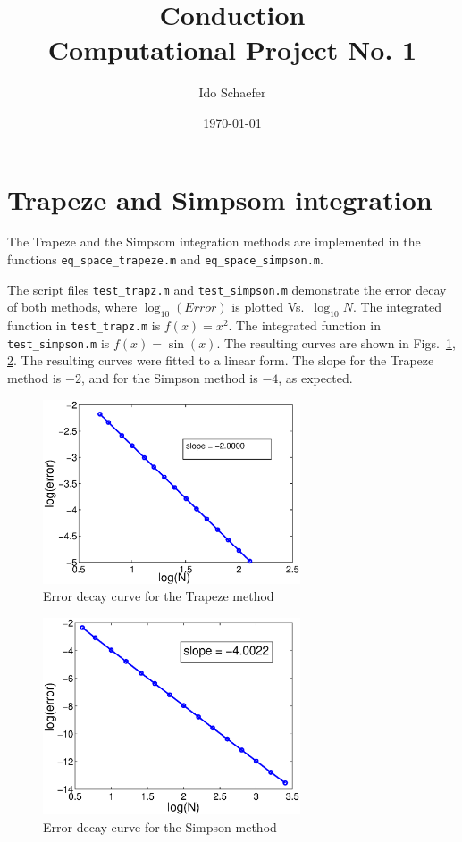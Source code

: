 \documentclass[12pt, a4paper]{article}
\begin{document}
\title{Conduction\\
Computational Project No. 1}
\author{Ido Schaefer}
\date{\today}
\maketitle

\section{Trapeze and Simpsom integration}
The Trapeze and the Simpsom integration methods are implemented in the functions \texttt{eq\_space\_trapeze.m} and \texttt{eq\_space\_simpson.m}.

The script files \texttt{test\_trapz.m} and \texttt{test\_simpson.m} demonstrate the error decay of both methods, where $\log_{10}(Error)$ is plotted Vs.\ $\log_{10}N$. The integrated function in \texttt{test\_trapz.m} is $f(x)=x^2$. The integrated function in \texttt{test\_simpson.m} is $f(x)=\sin(x)$. The resulting curves are shown in Figs.~\ref{fig:trapeze}, \ref{fig:simpson}. The resulting curves were fitted to a linear form. The slope for the Trapeze method is $-2$, and for the Simpson method is $-4$, as expected.

\begin{figure}[htb]
	\centering\includegraphics[width=3in]{trapeze}
	\caption{Error decay curve for the Trapeze method}\label{fig:trapeze}
\end{figure}

\begin{figure}[htb]
	\centering\includegraphics[width=3in]{simpson}
	\caption{Error decay curve for the Simpson method}\label{fig:simpson}
\end{figure}
\end{document}

